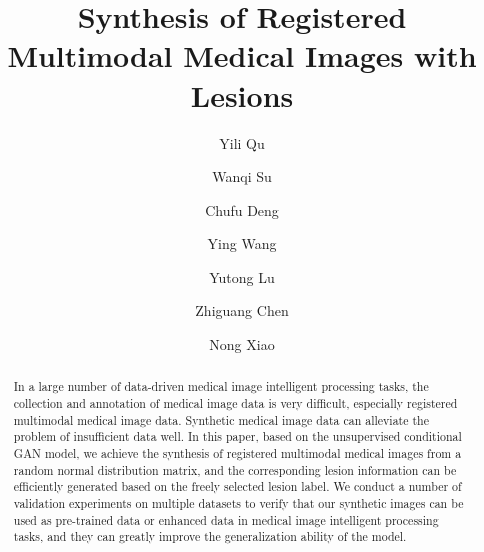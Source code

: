 \documentclass[runningheads]{llncs}
\begin{document}
%
\title{Synthesis of Registered Multimodal
		Medical Images with Lesions}
%
\author{ Yili Qu \and Wanqi Su \and Chufu Deng \and Ying Wang \\
	\and Yutong Lu \and Zhiguang Chen \and Nong Xiao}
%
%
%
\maketitle              %
%
\begin{abstract}
In a large number of data-driven medical image intelligent processing tasks, the collection and annotation of medical image data is very difficult, especially registered multimodal medical image data. Synthetic medical image data can alleviate the problem of insufficient data well. In this paper, based on the unsupervised conditional GAN model, we achieve the synthesis of registered multimodal medical images from a random normal distribution matrix, and the corresponding lesion information can be efficiently generated based on the freely selected lesion label. We conduct a number of validation experiments on multiple datasets to verify that our synthetic images can be used as pre-trained data or enhanced data in medical image intelligent processing tasks, and they can greatly improve the generalization ability of the model.

\end{abstract}
%
%
%
\end{document}
